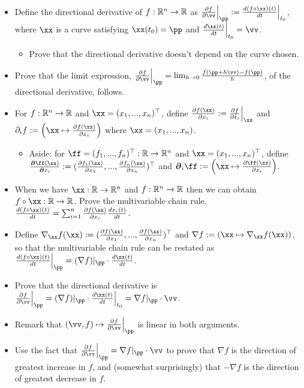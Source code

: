 \begin{itemize}
    \item Define the directional derivative of $f:\mathbb{R}^n \rightarrow \mathbb{R}$ as $\frac{\pd f}{\pd \vv} \Big|_\pp := \frac{d (f \circ \xx)(t)}{dt}\Big|_{t_0}$, where $\xx$ is a curve satisfying $\xx(t_0) = \pp$ and $\frac{d\xx(t)}{dt}\Big|_{t_0} = \vv$.
    \begin{itemize}
        \item Prove that the directional derivative doesn't depend on the curve chosen.
    \end{itemize}
    \item Prove that the limit expression, $\frac{\pd f}{\pd \vv}\Big|_\pp = \lim_{h \rightarrow 0} \frac{f(\pp + h\vv) - f(\pp)}{h}$, of the directional derivative, follows.
    \item For $f:\mathbb{R}^n \rightarrow \mathbb{R}$ and $\xx = (x_1, ..., x_n)^\top$, define $\frac{\pd f(\xx)}{\pd x_i} := \frac{\pd f}{\pd \see_i}\Big|_\xx$ and $\pd_i f := \left(\xx \mapsto \frac{\pd f(\xx)}{\pd x_i}\right)$ where $\xx = (x_1, ..., x_n)$.
    \begin{itemize}
        \item Aside: for $\ff = (f_1, ..., f_n)^\top:\R \rightarrow \R^n$ and $\xx = (x_1, ..., x_n)^\top$, define $\frac{\boldsymbol{\pd} \ff(\xx)}{\boldsymbol{\pd} x_i} := (\frac{\pd f_1(\xx)}{\pd x_1}, ..., \frac{\pd f_n(\xx)}{\pd x_n})^\top$ and $\boldsymbol{\pd}_i \ff := \left(\xx \mapsto \frac{\pd \ff(\xx)}{\pd x_i}\right)$.
    \end{itemize}
    \item When we have $\xx:\R \rightarrow \R^n$ and $f:\mathbb{R}^n \rightarrow \mathbb{R}$ then we can obtain $f \circ \xx:\R \rightarrow \R$. Prove the multivariable chain rule, $\frac{d (f \circ \xx)(t)}{dt} =\sum_{i = 1}^n \frac{\pd f(\xx)}{\pd x_i} \frac{dx_i(t)}{dt}$.
    \item Define $\nabla_\xx f(\xx) := (\frac{\pd f(\xx)}{\pd x_1}, ..., \frac{\pd f(\xx)}{\pd x_n})^\top$ and $\nabla f := \left( \xx \mapsto \nabla_\xx f(\xx) \right)$, so that the multivariable chain rule can be restated as $\frac{d(f \circ \xx)(t)}{dt}\Big|_\pp = (\nabla f)|_\pp \cdot \frac{d\xx(t)}{dt}$.
    \item Prove that the directional derivative is $\frac{\pd f}{\pd \vv} \Big|_\pp = (\nabla f)|_\pp \cdot \frac{d\xx(t)}{dt}\Big|_{t_0}= \nabla f|_\pp \cdot \vv$.
    \item Remark that $(\vv, f) \mapsto \frac{\pd f}{\pd \vv} \Big|_\pp$ is linear in both arguments.
    \item Use the fact that $\frac{\pd f}{\pd \vv}\Big|_\pp = \nabla f|_\pp \cdot \vv$ to prove that $\nabla f$ is the direction of greatest increase in $f$, and (somewhat surprisingly) that $-\nabla f$ is the direction of greatest decrease in $f$.
\end{itemize}


